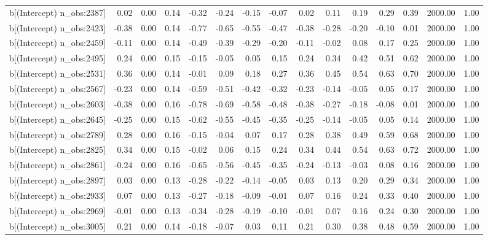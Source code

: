 \begin{table}[ht]
\begin{tabular}{rrrrrrrrrrrrrrr}
  b[(Intercept) n\_obs:2387] & 0.02 & 0.00 & 0.14 & -0.32 & -0.24 & -0.15 & -0.07 & 0.02 & 0.11 & 0.19 & 0.29 & 0.39 & 2000.00 & 1.00 \\ 
  b[(Intercept) n\_obs:2423] & -0.38 & 0.00 & 0.14 & -0.77 & -0.65 & -0.55 & -0.47 & -0.38 & -0.28 & -0.20 & -0.10 & 0.01 & 2000.00 & 1.00 \\ 
  b[(Intercept) n\_obs:2459] & -0.11 & 0.00 & 0.14 & -0.49 & -0.39 & -0.29 & -0.20 & -0.11 & -0.02 & 0.08 & 0.17 & 0.25 & 2000.00 & 1.00 \\ 
  b[(Intercept) n\_obs:2495] & 0.24 & 0.00 & 0.15 & -0.15 & -0.05 & 0.05 & 0.15 & 0.24 & 0.34 & 0.42 & 0.51 & 0.62 & 2000.00 & 1.00 \\ 
  b[(Intercept) n\_obs:2531] & 0.36 & 0.00 & 0.14 & -0.01 & 0.09 & 0.18 & 0.27 & 0.36 & 0.45 & 0.54 & 0.63 & 0.70 & 2000.00 & 1.00 \\ 
  b[(Intercept) n\_obs:2567] & -0.23 & 0.00 & 0.14 & -0.59 & -0.51 & -0.42 & -0.32 & -0.23 & -0.14 & -0.05 & 0.05 & 0.17 & 2000.00 & 1.00 \\ 
  b[(Intercept) n\_obs:2603] & -0.38 & 0.00 & 0.16 & -0.78 & -0.69 & -0.58 & -0.48 & -0.38 & -0.27 & -0.18 & -0.08 & 0.01 & 2000.00 & 1.00 \\ 
  b[(Intercept) n\_obs:2645] & -0.25 & 0.00 & 0.15 & -0.62 & -0.55 & -0.45 & -0.35 & -0.25 & -0.14 & -0.05 & 0.05 & 0.14 & 2000.00 & 1.00 \\ 
  b[(Intercept) n\_obs:2789] & 0.28 & 0.00 & 0.16 & -0.15 & -0.04 & 0.07 & 0.17 & 0.28 & 0.38 & 0.49 & 0.59 & 0.68 & 2000.00 & 1.00 \\ 
  b[(Intercept) n\_obs:2825] & 0.34 & 0.00 & 0.15 & -0.02 & 0.06 & 0.15 & 0.24 & 0.34 & 0.44 & 0.54 & 0.63 & 0.72 & 2000.00 & 1.00 \\ 
  b[(Intercept) n\_obs:2861] & -0.24 & 0.00 & 0.16 & -0.65 & -0.56 & -0.45 & -0.35 & -0.24 & -0.13 & -0.03 & 0.08 & 0.16 & 2000.00 & 1.00 \\ 
  b[(Intercept) n\_obs:2897] & 0.03 & 0.00 & 0.13 & -0.28 & -0.22 & -0.14 & -0.05 & 0.03 & 0.13 & 0.20 & 0.29 & 0.34 & 2000.00 & 1.00 \\ 
  b[(Intercept) n\_obs:2933] & 0.07 & 0.00 & 0.13 & -0.27 & -0.18 & -0.09 & -0.01 & 0.07 & 0.16 & 0.24 & 0.33 & 0.40 & 2000.00 & 1.00 \\ 
  b[(Intercept) n\_obs:2969] & -0.01 & 0.00 & 0.13 & -0.34 & -0.28 & -0.19 & -0.10 & -0.01 & 0.07 & 0.16 & 0.24 & 0.30 & 2000.00 & 1.00 \\ 
  b[(Intercept) n\_obs:3005] & 0.21 & 0.00 & 0.14 & -0.18 & -0.07 & 0.03 & 0.11 & 0.21 & 0.30 & 0.38 & 0.48 & 0.59 & 2000.00 & 1.00 \\ 

\end{tabular}
\end{table}
